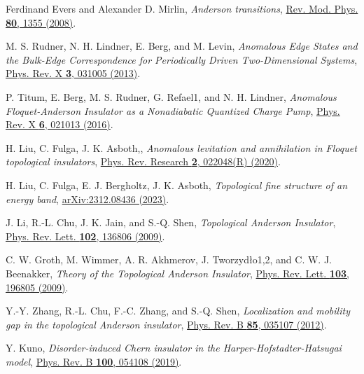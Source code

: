 \documentclass[aps,prl,amsmath,amssymb,twocolumn, superscriptaddress]{revtex4-2}
\begin{document}
\begin{thebibliography}{10}
Ferdinand Evers and Alexander D. Mirlin, {\em Anderson transitions}, \href{https://journals.aps.org/rmp/abstract/10.1103/RevModPhys.80.1355}{Rev. Mod. Phys. {\bf{80}}, 1355 (2008)}.

M. S. Rudner, N. H. Lindner, E. Berg, and M. Levin, {\em Anomalous Edge States and the Bulk-Edge Correspondence for Periodically Driven Two-Dimensional Systems}, \href{https://journals.aps.org/prx/abstract/10.1103/PhysRevX.3.031005}{Phys. Rev. X {\bf 3}, 031005 (2013)}.

P. Titum, E. Berg, M. S. Rudner, G. Refael1, and N. H. Lindner, {\em Anomalous Floquet-Anderson Insulator as a Nonadiabatic Quantized Charge Pump}, \href{https://journals.aps.org/prx/abstract/10.1103/PhysRevX.6.021013}{Phys. Rev. X {\bf 6}, 021013 (2016)}.

H. Liu, C. Fulga, J. K. Asboth,, {\em Anomalous levitation and annihilation in Floquet topological insulators}, \href{https://journals.aps.org/prresearch/abstract/10.1103/PhysRevResearch.2.022048}{Phys. Rev. Research {\bf 2}, 022048(R) (2020)}.

H. Liu, C. Fulga, E. J. Bergholtz, J. K. Asboth, {\em Topological fine structure of an energy band}, \href{https://arxiv.org/abs/2312.08436}{arXiv:2312.08436 (2023)}.

J. Li, R.-L. Chu, J. K. Jain, and S.-Q. Shen, {\em Topological Anderson Insulator}, \href{https://journals.aps.org/prl/abstract/10.1103/PhysRevLett.102.136806}{Phys. Rev. Lett. {\bfseries 102}, 136806 (2009)}.

C. W. Groth, M. Wimmer, A. R. Akhmerov, J. Tworzydło1,2, and C. W. J. Beenakker, {\em Theory of the Topological Anderson Insulator}, \href{https://journals.aps.org/prl/abstract/10.1103/PhysRevLett.103.196805}{Phys. Rev. Lett. {\bfseries 103}, 196805 (2009)}.

Y.-Y. Zhang, R.-L. Chu, F.-C. Zhang, and S.-Q. Shen, {\em Localization and mobility gap in the topological Anderson insulator}, \href{https://journals.aps.org/prb/abstract/10.1103/PhysRevB.85.035107}{Phys. Rev. B {\bfseries 85}, 035107 (2012)}.

Y. Kuno, {\em Disorder-induced Chern insulator in the Harper-Hofstadter-Hatsugai model}, \href{https://journals.aps.org/prb/abstract/10.1103/PhysRevB.100.054108}{Phys. Rev. B {\bfseries 100}, 054108 (2019)}.


\end{thebibliography}
\end{document}
